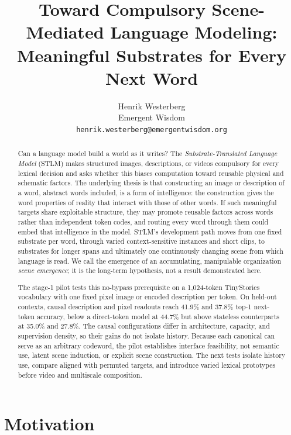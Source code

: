 \documentclass[11pt,a4paper]{article}
\title{Toward Compulsory Scene-Mediated Language Modeling:\\Meaningful Substrates for Every Next Word}
\author{Henrik Westerberg\\Emergent Wisdom\\\texttt{henrik.westerberg@emergentwisdom.org}}
\begin{document}
\maketitle

\begin{abstract}
\noindent Can a language model build a world as it writes? The \emph{Substrate-Translated Language Model} (STLM) makes structured images, descriptions, or videos compulsory for every lexical decision and asks whether this biases computation toward reusable physical and schematic factors. The underlying thesis is that constructing an image or description of a word, abstract words included, is a form of intelligence: the construction gives the word properties of reality that interact with those of other words. If such meaningful targets share exploitable structure, they may promote reusable factors across words rather than independent token codes, and routing every word through them could embed that intelligence in the model. STLM's development path moves from one fixed substrate per word, through varied context-sensitive instances and short clips, to substrates for longer spans and ultimately one continuously changing scene from which language is read. We call the emergence of an accumulating, manipulable organization \emph{scene emergence}; it is the long-term hypothesis, not a result demonstrated here.

The stage-1 pilot tests this no-bypass prerequisite on a 1,024-token TinyStories vocabulary with one fixed pixel image or encoded description per token. On held-out contexts, causal description and pixel readouts reach 41.9\% and 37.8\% top-1 next-token accuracy, below a direct-token model at 44.7\% but above stateless counterparts at 35.0\% and 27.8\%. The causal configurations differ in architecture, capacity, and supervision density, so their gains do not isolate history. Because each canonical can serve as an arbitrary codeword, the pilot establishes interface feasibility, not semantic use, latent scene induction, or explicit scene construction. The next tests isolate history use, compare aligned with permuted targets, and introduce varied lexical prototypes before video and multiscale composition.
\end{abstract}


\section{Motivation}
\end{document}
